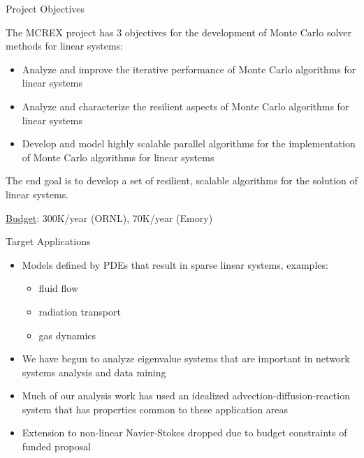 \documentclass{beamer}
\begin{document}
\begin{frame}{Project Objectives}

  The MCREX project has 3 objectives for the development of Monte Carlo solver
  methods for linear systems:
  \begin{itemize}
  \item Analyze and improve the iterative performance of Monte Carlo
    algorithms for linear systems
  \item Analyze and characterize the resilient aspects of Monte Carlo
    algorithms for linear systems
  \item Develop and model highly scalable parallel algorithms for the
    implementation of Monte Carlo algorithms for linear systems
 \end{itemize}
 The end goal is to develop a set of resilient, scalable algorithms for the
 solution of linear systems.

 \vfill

 \underline{Budget}: 300K/year (ORNL), 70K/year (Emory)

\end{frame}


\begin{frame}{Target Applications}

  \begin{itemize}

  \item Models defined by PDEs that result in sparse linear systems, examples:
    \begin{itemize}
    \item fluid flow
    \item radiation transport
    \item gas dynamics
    \end{itemize}

  \item We have begun to analyze eigenvalue systems that are important in
    network systems analysis and data mining

  \item Much of our analysis work has used an idealized
    advection-diffusion-reaction system that has properties common to these
    application areas

  \item Extension to non-linear Navier-Stokes dropped due to budget
    constraints of funded proposal
  \end{itemize}

\end{frame}
\end{document}
